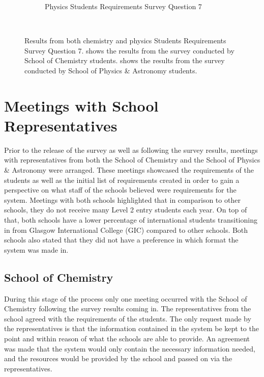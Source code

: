 \documentclass{l4proj}
\begin{document}
\begin{figure}[ht]
\begin{subfigure}[b]{0.7\textwidth}
        \caption{Physics Students Requirements Survey Question 7}
        \label{fig:req2}
    \end{subfigure}
    ~ %
    \caption{Results from both chemistry and physics Students Requirements Survey Question 7.  shows the results from the survey conducted by School of Chemistry students.  shows the results from the survey conducted by School of Physics \& Astronomy students.
    }\label{fig:requirements}
\end{figure}

\section{Meetings with School Representatives}
Prior to the release of the survey as well as following the survey results,  meetings with representatives from both the School of Chemistry and the School of Physics \& Astronomy were arranged. These meetings showcased the requirements of the students as well as the initial list of requirements created in order to gain a perspective on what staff of the schools believed were requirements for the system. Meetings with both schools highlighted that in comparison to other schools,  they do not receive many Level 2 entry students each year. On top of that,  both schools have a lower percentage of international students transitioning in from Glasgow International College (GIC) compared to other schools. Both schools also stated that they did not have a preference in which format the system was made in.

\subsection{School of Chemistry}
During this stage of the process only one meeting occurred with the School of Chemistry following the survey results coming in. The representatives from the school agreed with the requirements of the students. The only request made by the representatives is that the information contained in the system be kept to the point and within reason of what the schools are able to provide. An agreement was made that the system would only contain the necessary information needed,  and the resources would be provided by the school and passed on via the representatives.
\end{document}
